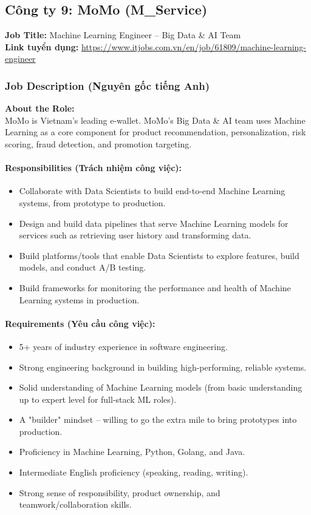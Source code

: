 \subsection{Công ty 9: MoMo (M\_Service)}

\noindent\textbf{Job Title:} Machine Learning Engineer -- Big Data \& AI Team \\
\textbf{Link tuyển dụng:} \url{https://www.itjobs.com.vn/en/job/61809/machine-learning-engineer}

\subsubsection*{Job Description (Nguyên gốc tiếng Anh)}

\textbf{About the Role:} \\
\indent MoMo is Vietnam's leading e-wallet. MoMo's Big Data \& AI team uses Machine Learning as a core component for product recommendation, personalization, risk scoring, fraud detection, and promotion targeting.

\paragraph{Responsibilities (Trách nhiệm công việc):}
\begin{itemize}
    \item Collaborate with Data Scientists to build end-to-end Machine Learning systems, from prototype to production.
    \item Design and build data pipelines that serve Machine Learning models for services such as retrieving user history and transforming data.
    \item Build platforms/tools that enable Data Scientists to explore features, build models, and conduct A/B testing.
    \item Build frameworks for monitoring the performance and health of Machine Learning systems in production.
\end{itemize}

\paragraph{Requirements (Yêu cầu công việc):}
\begin{itemize}
    \item 5+ years of industry experience in software engineering.
    \item Strong engineering background in building high-performing, reliable systems.
    \item Solid understanding of Machine Learning models (from basic understanding up to expert level for full-stack ML roles).
    \item A "builder" mindset -- willing to go the extra mile to bring prototypes into production.
    \item Proficiency in Machine Learning, Python, Golang, and Java.
    \item Intermediate English proficiency (speaking, reading, writing).
    \item Strong sense of responsibility, product ownership, and teamwork/collaboration skills.
\end{itemize}
